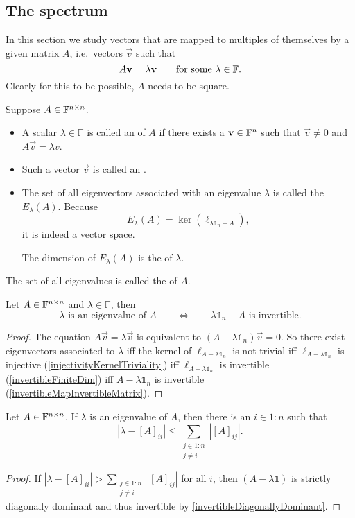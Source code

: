 \subsection{The spectrum}
In this section we study vectors that are mapped to multiples of themselves by a given matrix $A$, i.e.\ vectors $\vec{v}$ such that
\[ A\boldsymbol{\mathrm{v}} = \lambda \boldsymbol{\mathrm{v}} \qquad\text{for some $\lambda\in\mathbb{F}$.} \]
Clearly for this to be possible, $A$ needs to be square.
\begin{definition}
Suppose $A\in \mathbb{F}^{n\times n}$.
\begin{itemize}
\item  A scalar $\lambda\in \mathbb{F}$ is called an  of $A$ if there exists a $\boldsymbol{\mathrm{v}}\in \mathbb{F}^n$ such that $\vec{v}\neq 0$ and $A\vec{v} = \lambda v$.
\item Such a vector $\vec{v}$ is called an .
\item The set of all eigenvectors associated with an eigenvalue $\lambda$ is called the  $E_\lambda(A)$. Because
\[ E_\lambda(A) = \ker(\ell_{\lambda \mathbb{1}_{n} - A}), \]
it is indeed a vector space.

The dimension of $E_\lambda(A)$ is the  of $\lambda$.
\end{itemize}
The set of all eigenvalues is called the  of $A$.
\end{definition}
\begin{proposition}
Let $A\in \mathbb{F}^{n\times n}$ and $\lambda\in \mathbb{F}$, then
\[ \text{$\lambda$ is an eigenvalue of $A$} \qquad \iff \qquad \text{$\lambda \mathbb{1}_{n} - A$ is invertible.} \]
\end{proposition}
\begin{proof}
The equation $A\vec{v} = \lambda \vec{v}$ is equivalent to $(A-\lambda \mathbb{1}_n)\vec{v} = 0$. So there exist eigenvectors associated to $\lambda$ iff the kernel of $\ell_{A-\lambda \mathbb{1}_n}$ is not trivial iff $\ell_{A-\lambda \mathbb{1}_n}$ is injective (\ref{injectivityKernelTriviality}) iff $\ell_{A-\lambda \mathbb{1}_n}$ is invertible (\ref{invertibleFiniteDim}) iff $A-\lambda \mathbb{1}_n$ is invertible (\ref{invertibleMapInvertibleMatrix}).
\end{proof}

\begin{proposition}
Let $A\in \mathbb{F}^{n\times n}$. If $\lambda$ is an eigenvalue of $A$, then there is an $i\in 1:n$ such that
\[ |\lambda - [A]_{ii}| \leq \sum_{\substack{j\in 1:n \\ j \neq i}}|[A]_{ij}|. \]
\end{proposition}
\begin{proof}
If $|\lambda - [A]_{ii}| > \sum_{\substack{j\in 1:n \\ j \neq i}}|[A]_{ij}|$ for all $i$, then $(A-\lambda\mathbb{1})$ is strictly diagonally dominant and thus invertible by \ref{invertibleDiagonallyDominant}.
\end{proof}

